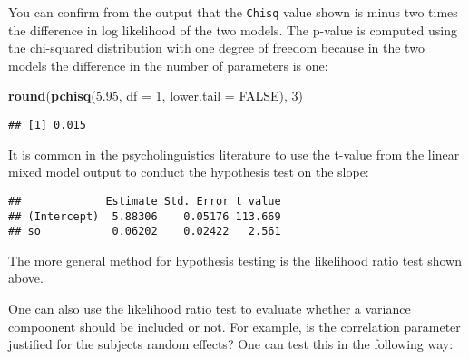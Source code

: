 \documentclass[12pt,]{krantz}
\newenvironment{Shaded}{\begin{snugshade}}{\end{snugshade}}
\newcommand{\DataTypeTok}[1]{\textcolor[rgb]{0.13,0.29,0.53}{#1}}
\newcommand{\DecValTok}[1]{\textcolor[rgb]{0.00,0.00,0.81}{#1}}
\newcommand{\FloatTok}[1]{\textcolor[rgb]{0.00,0.00,0.81}{#1}}
\newcommand{\KeywordTok}[1]{\textcolor[rgb]{0.13,0.29,0.53}{\textbf{#1}}}
\newcommand{\NormalTok}[1]{#1}
\newcommand{\OperatorTok}[1]{\textcolor[rgb]{0.81,0.36,0.00}{\textbf{#1}}}
\newcommand{\OtherTok}[1]{\textcolor[rgb]{0.56,0.35,0.01}{#1}}
\begin{document}
You can confirm from the output that the \texttt{Chisq} value shown is minus two times the difference in log likelihood of the two models. The p-value is computed using the chi-squared distribution with one degree of freedom because in the two models the difference in the number of parameters is one:

\begin{Shaded}
\begin{Highlighting}[]
\KeywordTok{round}\NormalTok{(}\KeywordTok{pchisq}\NormalTok{(}\FloatTok{5.95}\NormalTok{, }\DataTypeTok{df =} \DecValTok{1}\NormalTok{, }\DataTypeTok{lower.tail =} \OtherTok{FALSE}\NormalTok{), }
  \DecValTok{3}\NormalTok{)}
\end{Highlighting}
\end{Shaded}

\begin{verbatim}
## [1] 0.015
\end{verbatim}

It is common in the psycholinguistics literature to use the t-value from the linear mixed model output to conduct the hypothesis test on the slope:

\begin{Shaded}
\end{Shaded}

\begin{verbatim}
##             Estimate Std. Error t value
## (Intercept)  5.88306    0.05176 113.669
## so           0.06202    0.02422   2.561
\end{verbatim}

The more general method for hypothesis testing is the likelihood ratio test shown above.

One can also use the likelihood ratio test to evaluate whether a variance compoonent should be included or not. For example, is the correlation parameter justified for the subjects random effects? One can test this in the following way:
\end{document}
